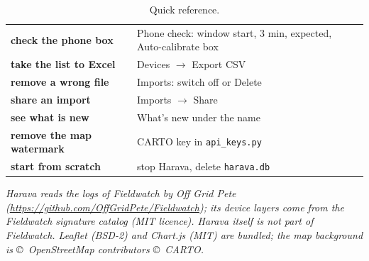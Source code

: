 \documentclass[10pt,a4paper]{article}
\newcommand{\ui}[1]{\textsf{\small #1}}            %
\begin{document}
\begin{table}[H]
\begin{tabularx}{\textwidth}{>{\bfseries}p{4.2cm}X}
check the phone box & \ui{Phone check}: window start, 3 min, expected, \ui{Auto-calibrate box}\\
take the list to Excel & \ui{Devices $\rightarrow$ Export CSV}\\
remove a wrong file & \ui{Imports}: switch off or \ui{Delete}\\
share an import & \ui{Imports $\rightarrow$ Share}\\
see what is new & \ui{What's new} under the name\\
remove the map watermark & CARTO key in \texttt{api\_keys.py}\\
start from scratch & stop Harava, delete \texttt{harava.db}\\
\bottomrule
\end{tabularx}
\caption{Quick reference.}
\end{table}

\vfill
{\small\textit{Harava reads the logs of Fieldwatch by Off Grid Pete (\url{https://github.com/OffGridPete/Fieldwatch}); its device layers come from the Fieldwatch signature catalog (MIT licence). Harava itself is not part of Fieldwatch. Leaflet (BSD-2) and Chart.js (MIT) are bundled; the map background is \copyright~OpenStreetMap contributors \copyright~CARTO.}}
\end{document}

